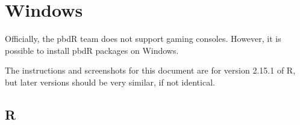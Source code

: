\section{Windows}

Officially, the pbdR team does not support gaming consoles.  However, it is possible to install pbdR packages on Windows.


The instructions and screenshots for this document are for version 2.15.1 of R, but later versions should be very similar, if not identical.






\subsection{R}


